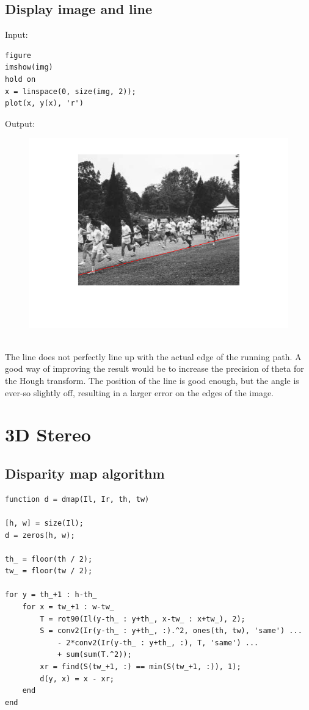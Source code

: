 \documentclass[12pt, a4paper]{article}
\begin{document}
\subsection{Display image and line}
Input:
\begin{verbatim}
figure
imshow(img)
hold on
x = linspace(0, size(img, 2));
plot(x, y(x), 'r')
\end{verbatim}
Output:
\begin{figure}[H]
	\centering
	\includegraphics[width=\textwidth]{fig16.png}
\end{figure}
~\\
The line does not perfectly line up with the actual edge of the running path. A good way of improving the result would be to increase the precision of theta for the Hough transform. The position of the line is good enough, but the angle is ever-so slightly off, resulting in a larger error on the edges of the image.

\newpage

\section{3D Stereo}
\subsection{Disparity map algorithm}
\begin{verbatim}
function d = dmap(Il, Ir, th, tw)

[h, w] = size(Il);
d = zeros(h, w);

th_ = floor(th / 2);
tw_ = floor(tw / 2);

for y = th_+1 : h-th_
    for x = tw_+1 : w-tw_
        T = rot90(Il(y-th_ : y+th_, x-tw_ : x+tw_), 2);
        S = conv2(Ir(y-th_ : y+th_, :).^2, ones(th, tw), 'same') ...
            - 2*conv2(Ir(y-th_ : y+th_, :), T, 'same') ...
            + sum(sum(T.^2));
        xr = find(S(tw_+1, :) == min(S(tw_+1, :)), 1);
        d(y, x) = x - xr;
    end
end
\end{verbatim}
\end{document}
